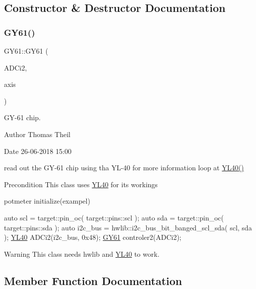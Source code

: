 \subsection{Constructor \& Destructor Documentation}
\mbox{\label{class_g_y61_a2599179d0c2c4c26e87aab76ab6ee410}} 
\subsubsection{\texorpdfstring{G\+Y61()}{GY61()}}
{\footnotesize\ttfamily G\+Y61\+::\+G\+Y61 (\begin{DoxyParamCaption}\item[{\mbox{\hyperlink{class_y_l40}{Y\+L40}} \&}]{A\+D\+Ci2,  }\item[{char}]{axis }\end{DoxyParamCaption})}



G\+Y-\/61 chip. 

\begin{DoxyAuthor}{Author}
Thomas Theil 
\end{DoxyAuthor}
\begin{DoxyDate}{Date}
26-\/06-\/2018 15\+:00
\end{DoxyDate}
read out the G\+Y-\/61 chip using tha Y\+L-\/40 for more information loop at \mbox{\hyperlink{class_y_l40}{Y\+L40()}}

\begin{DoxyPrecond}{Precondition}
This class uses \mbox{\hyperlink{class_y_l40}{Y\+L40}} for its workings 
\end{DoxyPrecond}
potmeter initialize(exampel) 
\begin{DoxyCode}
\textcolor{keyword}{auto} scl     = target::pin\_oc( target::pins::scl );
\textcolor{keyword}{auto} sda      = target::pin\_oc( target::pins::sda );
\textcolor{keyword}{auto} i2c\_bus = hwlib::i2c\_bus\_bit\_banged\_scl\_sda( scl, sda );
\mbox{\hyperlink{class_y_l40}{YL40}} ADCi2(i2c\_bus, 0x48);
\mbox{\hyperlink{class_g_y61}{GY61}} controler2(ADCi2);
\end{DoxyCode}


\begin{DoxyWarning}{Warning}
This class needs hwlib and \mbox{\hyperlink{class_y_l40}{Y\+L40}} to work. 
\end{DoxyWarning}


\subsection{Member Function Documentation}
\mbox{\label{class_g_y61_a3163809be7dd33dc0c46ba503b55394a}} 
